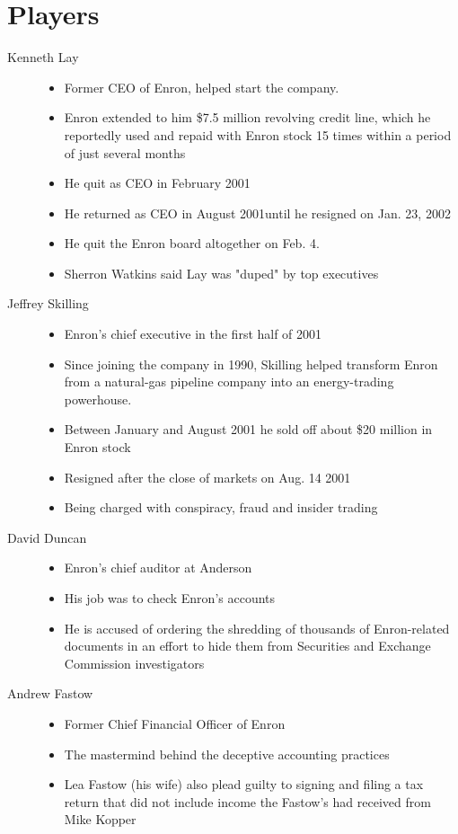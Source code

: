 \documentclass[a4paper,11pt,oneside]{book}
\begin{document}
\section{Players}
\begin{description}
\item[Kenneth Lay] 
\begin{itemize}
\item Former CEO of Enron, helped start the company. 
\item Enron extended to him \$7.5 million revolving credit line, which he reportedly used and repaid with Enron stock 15 times within a period of just several months
\item He quit as CEO in February 2001
\item He returned as CEO in August 2001until he resigned on Jan. 23, 2002 
\item He quit the Enron board altogether on Feb. 4. 
\item Sherron Watkins said Lay was "duped" by top executives
\end{itemize}
\item[Jeffrey Skilling]  
\begin{itemize}
\item Enron's chief executive in the first half of 2001
\item Since joining the company in 1990, Skilling helped transform Enron from a natural-gas pipeline company into an energy-trading powerhouse.
\item Between January and August 2001 he sold off about \$20 million in Enron stock
\item Resigned after the close of markets on Aug. 14 2001
\item Being charged with conspiracy, fraud and insider trading
\end{itemize}
\item [David Duncan]  
\begin{itemize}
\item Enron's chief auditor at Anderson
\item His job was to check Enron’s accounts
\item He is accused of ordering the shredding of thousands of Enron-related documents in an effort to hide them from Securities and Exchange Commission investigators
\end{itemize}

\item[Andrew Fastow]  
\begin{itemize}
\item Former Chief Financial Officer of Enron
\item The mastermind behind the deceptive accounting practices
\item Lea Fastow (his wife) also plead guilty to signing and filing a tax return that did not include income the Fastow’s had received from Mike Kopper 
\end{itemize}


\end{description}
\end{document}
